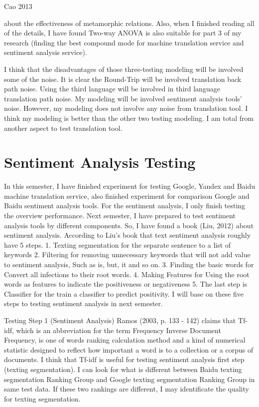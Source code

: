 \documentclass[conference]{IEEEtran}
\begin{document}
Cao 2013

about the effectiveness of metamorphic relations.
Also, when I finished reading all of the details, I have found Two-way ANOVA is
also suitable for part 3 of my research (finding the best compound mode for
machine translation service and sentiment analysis service).

I think that the disadvantages of those three-testing modeling will be involved some of the noise.
It is clear the Round-Trip will be involved translation back path noise. Using
the third language will be involved in third language translation path noise.
My modeling will be involved sentiment analysis tools’ noise. However, my
modeling does not involve any noise from translation tool. I think my modeling
is better than the other two testing modeling. I am total from another aspect
to test translation tool.
\section{Sentiment Analysis Testing}
 In this semester, I have finished experiment for testing Google, Yandex and Baidu machine translation service, also finished experiment for comparison Google and Baidu sentiment analysis tools. For the sentiment analysis, I only finish testing the overview performance. Next semester, I have prepared to test sentiment analysis tools by different components. So, I have found a book (Liu, 2012) about sentiment analysis. According to Liu’s book that text sentiment analysis roughly have 5 steps.
1. Texting segmentation for the separate sentence to a list of keywords
2. Filtering for removing unnecessary keywords that will not add value to sentiment analysis,
Such as is, but, it and so on.
3. Finding the basic words for Convert all infections to their root words.
4. Making Features for Using the root words as features to indicate the positiveness or negativeness
5. The last step is Classifier for the train a classifier to predict positivity.
I will base on these five steps to testing sentiment analysis in next semester.




Testing Step 1 (Sentiment Analysis)
Ramos (2003, p. 133 - 142) claims that Tf-idf, which is an abbreviation for the term Frequency Inverse Document Frequency, is one of words ranking calculation method and a kind of numerical statistic designed to reflect how important a word is to a collection or a corpus of documents.
I think that Tf-idf is useful for testing sentiment analysis first step (texting segmentation). I can look for what is different between Baidu texting segmentation Ranking Group and Google texting segmentation Ranking Group in same test data. If these two rankings are different, I may identificate the quality for texting segmentation.
\end{document}
